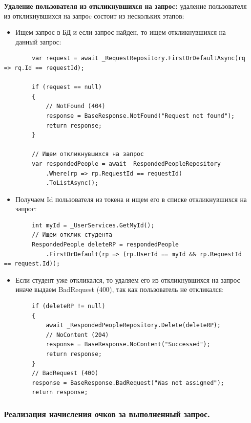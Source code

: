 \textbf{Удаление пользователя из откликнувшихся на запроc:} удаление пользователя из откликнувшихся на запроc состоит из нескольких этапов:
\begin{itemize}
	\item{Ищем запрос в БД и если запрос найден, то ищем откликнувшихся на данный запрос:}
\end{itemize}
\begin{verbatim}
        var request = await _RequestRepository.FirstOrDefaultAsync(rq => rq.Id == requestId);

        if (request == null)
        {
            // NotFound (404)
            response = BaseResponse.NotFound("Request not found");
            return response;
        }

        // Ищем откликнувшихся на запрос
        var respondedPeople = await _RespondedPeopleRepository
            .Where(rp => rp.RequestId == requestId)
            .ToListAsync();

\end{verbatim}

\begin{itemize}
	\item{Получаем Id пользователя из токена и ищем его в списке откликнувшихся на запрос:}
\end{itemize}
\begin{verbatim}
        int myId = _UserServices.GetMyId();
        // Ищем отклик студента
        RespondedPeople deleteRP = respondedPeople
            .FirstOrDefault(rp => (rp.UserId == myId && rp.RequestId == request.Id));

\end{verbatim}

\begin{itemize}
	\item{Если студент уже откликался, то удаляем его из откликнувшихся на запрос иначе выдаем BadRequest (400), так как пользователь не откликался:}
\end{itemize}
\begin{verbatim}
        if (deleteRP != null)
        {
            await _RespondedPeopleRepository.Delete(deleteRP);
            // NoContent (204)
            response = BaseResponse.NoContent("Successed");
            return response;
        }
        // BadRequest (400)
        response = BaseResponse.BadRequest("Was not assigned");
        return response;
\end{verbatim}

\subsubsection{Реализация начисления очков за выполненный запрос.}

